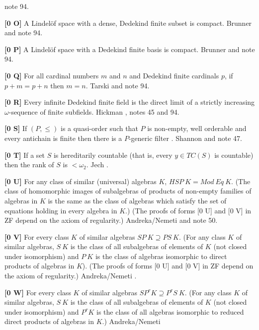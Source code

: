 note 94.
\smallskip
\item{}{\bf [0 O]}  A Lindel\"of space with a dense, Dedekind finite subset
is compact. \ac{Brunner} \cite{1982d} and note 94.
\smallskip
\item{}{\bf [0 P]}  A Lindel\"of space with a Dedekind finite
basis is compact. \ac{Brunner} \cite{1982d} and note 94.
\smallskip
\item{}{\bf [0 Q]}  For all cardinal  numbers $m$  and $n$  and  Dedekind
finite cardinals $p$, if $p + m = p + n$ then $m = n$. \ac{Tarski}
\cite{1949b} and note 94.
\smallskip
\item{}{\bf [0 R]}  Every infinite Dedekind finite field is the  direct
limit of a strictly increasing $\omega $-sequence of finite
subfields.  \ac{Hickman} \cite{1982}, notes 45 and 94.
\smallskip
\item{}{\bf [0 S]}  If $(P,\le)$ is a quasi-order such that $P$ is
non-empty, well orderable and every antichain is finite then there is a
$P$-generic filter .  \ac{Shannon} \cite{1990} and note 47.
\smallskip
\item{}{\bf [0 T]} If a set $S$ is hereditarily countable (that is, every
$y\in TC(S)$ is countable) then the rank of $S$ is $<\omega_2$.  \ac{Jech}
\cite{1982}. 
\smallskip
\item{}{\bf [0 U]}  For any class of similar (universal) algebras $K$,
$HSP\ K = Mod\ Eq\ K$. (The class of homomorphic images of
subalgebras of products of non-empty families of algebras in $K$ is the
same as the class of algebras which satisfy the set of equations
holding in every algebra in $K$.) (The proofs of forms [0 U] and [0 V] in ZF
depend on the axiom of regularity.) \ac{Andreka/Nemeti} \cite{1981} and note
50.
\smallskip
\item{}{\bf [0 V]}  For every class $K$ of similar algebras $SP\ K\supseteq
PS\ K$. (For any class $K$ of similar  algebras, $S\ K$ is the class of
all subalgebras of elements of $K$ (not closed under isomorphism) and
$P\ K$ is the class of algebras isomorphic to  direct  products  of
algebras in $K$). (The proofs of forms [0 U] and [0 V] in ZF depend on the
axiom of regularity.)  \ac{Andreka/Nemeti} \cite{1980}.
\smallskip
\item{}{\bf [0 W]}  For every class $K$ of similar algebras $SP^{r}K
\supseteq P^{r}S\ K$. (For any class $K$ of similar algebras, $S\ K$ is
the class of all subalgebras of elements of $K$ (not closed under
isomorphism) and $P^{r}K$ is the class of all algebras isomorphic to
reduced direct products of algebras in $K$.)  \ac{Andreka/Nemeti}
